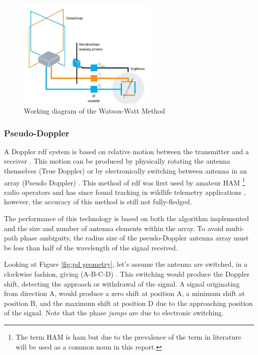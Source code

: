 \documentclass[class=report,11pt,crop=false]{standalone}
\begin{document}
\begin{figure}[h]
    \centering
    \includegraphics[width=0.6\textwidth]{Images/diagrams/ww-geom.jpg}
    \caption{Working diagram of the Watson-Watt Method \cite{ww-diagram}}
    \label{fig:ww-diagram}
\end{figure}
    
\subsubsection{Pseudo-Doppler}
A Doppler \gls{rdf} system is based on relative motion between the transmitter and a receiver \cite{pd-thesis}. This motion can be produced by physically rotating the antenna themselves (True Doppler) or by electronically switching between antenna in an array (Pseudo Doppler) \cite{pd-thesis}. This method of \gls{rdf} was first used by amateur HAM \footnote{The term HAM is \gls{ham} but due to the prevalence of the term in literature will be used as a common noun in this report.} radio operators and has since found tracking in wildlife telemetry applications \cite{pd-wildlife}, however, the accuracy of this method is still not fully-fledged.

The performance of this technology is based on both the algorithm implemented and the size and number of antenna elements within the array. To avoid multi-path phase ambiguity, the radius size of the pseudo-Doppler antenna array must be less than half of the wavelength of the signal received.

Looking at Figure \ref{fig:pd geometry}, let's assume the antenna are switched, in a clockwise fashion, giving (A-B-C-D) \cite{pd-thesis}. This switching would produce the Doppler shift, detecting the approach or withdrawal of the signal. A signal originating from direction A, would produce a zero shift at position A, a minimum shift at position B, and the maximum shift at position D due to the approaching position of the signal. Note that the phase \emph{jumps} are due to electronic switching. 
\end{document}
